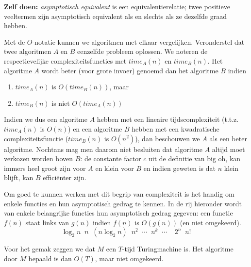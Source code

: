 {\bf Zelf doen:} {\em asymptotisch equivalent} is een equivalentierelatie;
twee positieve veeltermen zijn asymptotisch equivalent als en slechts
als ze dezelfde graad hebben.



Met de $O$-notatie kunnen we algoritmen met elkaar
vergelijken. Veronderstel dat twee algoritmen $A$ en $B$ eenzelfde
probleem oplossen. We noteren de respectievelijke
complexiteitsfuncties met $time_A(n)$ en $time_B(n)$. Het algoritme
$A$ wordt beter (voor grote invoer) genoemd dan het algoritme $B$
indien

\begin{enumerate}
\item $time_A(n)$ is $O(time_B(n))$, maar
\item $time_B(n)$ is niet $O(time_A(n))$
\end{enumerate}
Indien we dus een algoritme $A$ hebben met een lineaire
tijdscomplexiteit
(t.t.z. $time_A(n)$ is $O(n)$)
en een algoritme $B$ hebben met een kwadratische
complexiteitsfunctie
($time_B(n)$ is $O(n^2)$),
dan beschouwen we $A$ als
een beter algoritme.
Nochtans mag men daarom niet besluiten dat algoritme $A$ altijd moet
verkozen worden boven $B$: de constante factor $c$ uit de definitie van
big oh, kan immers heel groot zijn voor $A$ en klein voor $B$ en
indien geweten is dat $n$ klein blijft, kan $B$ effici\"enter zijn.



Om goed te kunnen werken met dit begrip van complexiteit is het handig
om enkele functies en hun asymptotisch gedrag te kennen. In de rij
hieronder wordt van enkele belangrijke functies
hun asymptotisch gedrag gegeven: een functie $f(n)$ staat links van
$g(n)$ indien $f(n)$ is $O(g(n))$  (en niet omgekeerd).
\[ \log_2 n \;\; n\;\; (n\log_2 n)\;\;  n^2\;\; \cdots\;\; n^k\;\;
\cdots\;\; \;\;2^n \;\; n!  \]





Voor het gemak zeggen we dat $M$ een $T$-tijd Turingmachine
is. Het algoritme door $M$ bepaald is dan $O(T)$, maar niet omgekeerd.




